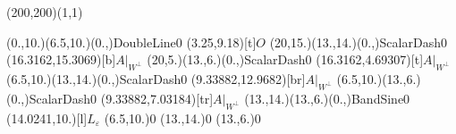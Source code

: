 \unitlength=1bp%

\begin{feynartspicture}(200,200)(1,1)

\FADiagram{}
\FAProp(0.,10.)(6.5,10.)(0.,){DoubleLine}{0}
\FALabel(3.25,9.18)[t]{$O$}
\FAProp(20,15.)(13.,14.)(0.,){ScalarDash}{0}
\FALabel(16.3162,15.3069)[b]{$A|_{W^\perp}$}
\FAProp(20,5.)(13.,6.)(0.,){ScalarDash}{0}
\FALabel(16.3162,4.69307)[t]{$A|_{W^\perp}$}
\FAProp(6.5,10.)(13.,14.)(0.,){ScalarDash}{0}
\FALabel(9.33882,12.9682)[br]{$A|_{W^\perp}$}
\FAProp(6.5,10.)(13.,6.)(0.,){ScalarDash}{0}
\FALabel(9.33882,7.03184)[tr]{$A|_{W^\perp}$}
\FAProp(13.,14.)(13.,6.)(0.,){BandSine}{0}
\FALabel(14.0241,10.)[l]{$L_\varepsilon$}
\FAVert(6.5,10.){0}
\FAVert(13.,14.){0}
\FAVert(13.,6.){0}
\end{feynartspicture}

